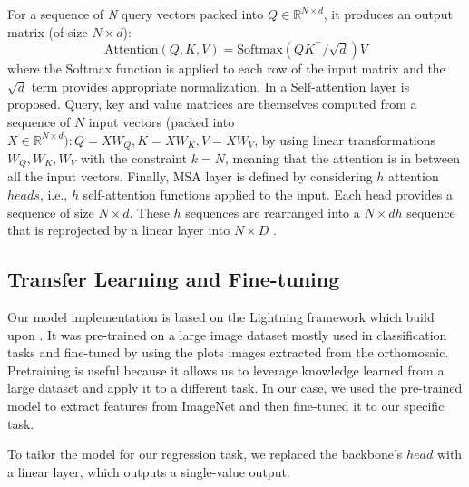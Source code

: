 For a sequence of \textit{N} query vectors packed into $Q \in \mathbb{R} ^{N \times d}$, it produces an output matrix (of size $N \times d$):
\begin{equation} \label{eq:attention} 
\text{Attention}(Q,K,V) = \text{Softmax}(QK^\intercal/\sqrt{d})V 
\end{equation}
where the Softmax function is applied to each row of the input matrix and the $\sqrt{d}$ term provides appropriate normalization. In \cite{vaswani2023attention} a Self-attention layer is proposed. Query, key and value matrices are themselves computed from a sequence of $N$ input vectors (packed into $X \in \mathbb{R} ^{N \times d}): Q = XW_{Q}, K = XW_{K}, V = XW_{V}$, by using linear transformations $W_{Q}, W_{K}, W_{V}$ with the constraint $k = N$, meaning that the attention is in between all the input vectors.
Finally, MSA layer is defined by considering $h$ attention $heads$, i.e., $h$ self-attention functions applied to the input. Each head provides a sequence of size $N \times d$.
These $h$ sequences are rearranged into a $N \times dh$ sequence that is reprojected by a linear layer into $N \times D$ \cite{touvron2021training}.

\subsection{Transfer Learning and Fine-tuning}
\label{subsec:TL-FT}

Our model implementation is based on the Lightning framework \cite{Falcon_PyTorch_Lightning_2019} which build upon \cite{paszke2019pytorch}.
It was pre-trained on a large image dataset\cite{deng2009imagenet} mostly used in classification tasks  and fine-tuned by using the plots images extracted from the orthomosaic. Pretraining is useful because it allows us to leverage knowledge learned from a large dataset and apply it to a different task.
In our case, we used the pre-trained model to extract features from ImageNet and then fine-tuned it to our specific task.

To tailor the model for our regression task, we replaced the backbone's $head$ with a linear layer, which outputs a single-value output.

